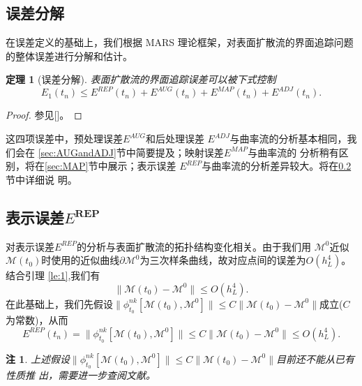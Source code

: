 \documentclass[a4paper,twoside]{ctexart}
\newtheorem{theorem}{定理}[section]
\newtheorem{remark}{注}[section]
\begin{document}
\subsection{误差分解}
\label{sec:decom}
在误差定义的基础上，我们根据 MARS 理论框架，对表面扩散流的界面追踪问题
的整体误差进行分解和估计。
\begin{theorem}[误差分解]
  表面扩散流的界面追踪误差可以被下式控制
  \begin{equation}
    \label{eq:errordes}
    E_1(t_n) \le E^{REP}(t_n) + E^{AUG}(t_n) +
    E^{MAP}(t_n) + E^{ADJ}(t_n).
  \end{equation}
\end{theorem}
\begin{proof}
  参见[\cite{ref7}]。
  \end{proof}
\indent 这四项误差中，预处理误差$E^{AUG}$和后处理误差
  $E^{ADJ}$与曲率流的分析基本相同，我们会在
  \ref{sec:AUGandADJ}节中简要提及；映射误差$E^{MAP}$与曲率流的
  分析稍有区别，将在\ref{sec:MAP}节中展示；表示误差
  $E^{REP}$与曲率流的分析差异较大。将在\ref{sec:REP}节中详细说
  明。
  
\subsection{表示误差$E^{\textbf{REP}}$}
\label{sec:REP}
对表示误差$E^{REP}$的分析与表面扩散流的拓扑结构变化相关。由于我们用
$\mathcal{M}^0$近似$\mathcal{M}(t_0)$时使用的近似曲线$\partial
\mathcal{M}^0$为三次样条曲线，故对应点间的误差为$O(h_L^4)$。结合引理
\ref{le:1},我们有
\begin{equation}
  \label{eq:initcontrol}
  \| \mathcal{M}(t_0) - \mathcal{M}^0\| \le O(h_L^4).
\end{equation}
在此基础上，我们先假设$\|\phi_{t_0}^{nk}[\mathcal{M}(t_0),\mathcal{M}^0]\|
  \le C\| \mathcal{M}(t_0) - \mathcal{M}^0\|$成立($C$为常数)，从而
\begin{equation}
  \label{eq:calREP}
  E^{REP}(t_n) = \|\phi_{t_0}^{nk}[\mathcal{M}(t_0),\mathcal{M}^0]\|
  \le C\| \mathcal{M}(t_0) - \mathcal{M}^0\| \le O(h_L^4).
\end{equation}
\begin{remark}
上述假设$\|\phi_{t_0}^{nk}[\mathcal{M}(t_0),\mathcal{M}^0]\|
  \le C\| \mathcal{M}(t_0) - \mathcal{M}^0\|$目前还不能从已有性质推
  出，需要进一步查阅文献。
\end{remark}
\end{document}
